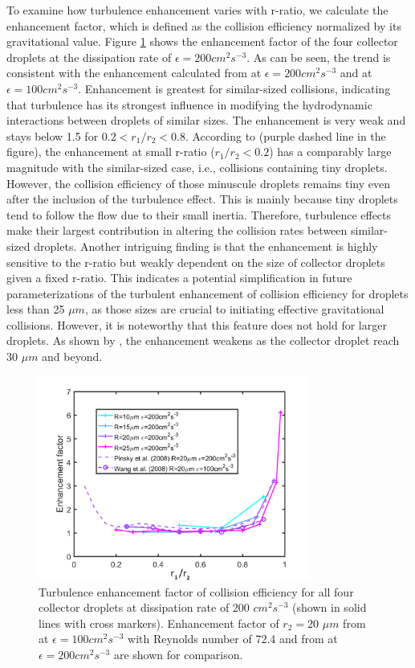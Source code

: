 To examine how turbulence enhancement varies with r-ratio, we calculate the enhancement factor, which is defined as the collision efficiency normalized by its gravitational value. Figure \ref{fig:enhance} shows the enhancement factor of the four collector droplets at the dissipation rate of $\epsilon = 200 cm^2s^{-3}$. As can be seen, the trend is consistent with the enhancement calculated from \citet{Pinsky2008} at $\epsilon = 200 cm^2s^{-3}$ and \citet{Wang2008} at $\epsilon = 100 cm^2s^{-3}$. Enhancement is greatest for similar-sized collisions, indicating that turbulence has its strongest influence in modifying the hydrodynamic interactions between droplets of similar sizes. The enhancement is very weak and stays below 1.5 for $0.2 < r_1/r_2 < 0.8$. According to \citet{Pinsky2008} (purple dashed line in the figure), the enhancement at small r-ratio ($r_1/r_2 < 0.2$) has a comparably large magnitude with the similar-sized case, i.e., collisions containing tiny droplets. However, the collision efficiency of those minuscule droplets remains tiny even after the inclusion of the turbulence effect. This is mainly because tiny droplets tend to follow the flow due to their small inertia. Therefore, turbulence effects make their largest contribution in altering the collision rates between similar-sized droplets. Another intriguing finding is that the enhancement is highly sensitive to the r-ratio but weakly dependent on the size of collector droplets given a fixed r-ratio. This indicates a potential simplification in future parameterizations of the turbulent enhancement of collision efficiency for droplets less than 25 $\mu m$, as those sizes are crucial to initiating effective gravitational collisions. However, it is noteworthy that this feature does not hold for larger droplets. As shown by \citet{Wang2008}, the enhancement weakens as the collector droplet reach 30 $\mu m$ and beyond. 


\begin{figure}[ht]
\centering
\includegraphics[width=0.8\textwidth]{Figures/Chap3/enhance.png}
\caption{ Turbulence enhancement factor of collision efficiency for all four collector droplets at dissipation rate of 200 $cm^2s^{-3}$ (shown in solid lines with cross markers). Enhancement factor of $r_2 = 20$ $\mu m$ from \citet{Wang2008} at $\epsilon = 100 cm^2s^{-3}$ with Reynolds number of 72.4 and from \citet{Pinsky2008} at $\epsilon = 200 cm^2s^{-3}$ are shown for comparison.} \label{fig:enhance}
\end{figure}


